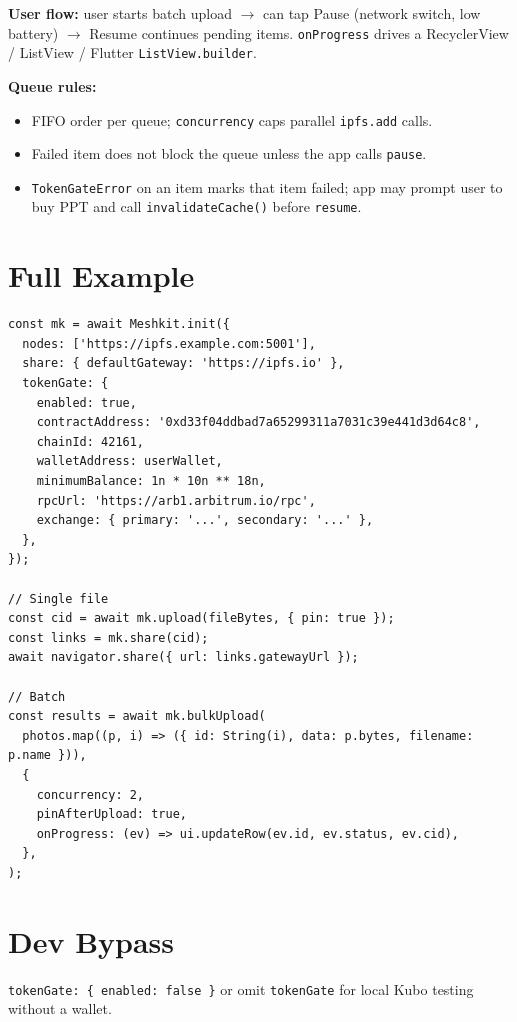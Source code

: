 \documentclass[11pt,a4paper,openany]{report}
\begin{document}
\textbf{User flow:} user starts batch upload $\rightarrow$ can tap Pause (network switch, low battery) $\rightarrow$ Resume continues pending items. \texttt{onProgress} drives a RecyclerView / ListView / Flutter \texttt{ListView.builder}.

\textbf{Queue rules:}
\begin{itemize}[leftmargin=*]
  \item FIFO order per queue; \texttt{concurrency} caps parallel \texttt{ipfs.add} calls.
  \item Failed item does not block the queue unless the app calls \texttt{pause}.
  \item \texttt{TokenGateError} on an item marks that item failed; app may prompt user to buy PPT and call \texttt{invalidateCache()} before \texttt{resume}.
\end{itemize}

\section{Full Example}

\begin{lstlisting}
const mk = await Meshkit.init({
  nodes: ['https://ipfs.example.com:5001'],
  share: { defaultGateway: 'https://ipfs.io' },
  tokenGate: {
    enabled: true,
    contractAddress: '0xd33f04ddbad7a65299311a7031c39e441d3d64c8',
    chainId: 42161,
    walletAddress: userWallet,
    minimumBalance: 1n * 10n ** 18n,
    rpcUrl: 'https://arb1.arbitrum.io/rpc',
    exchange: { primary: '...', secondary: '...' },
  },
});

// Single file
const cid = await mk.upload(fileBytes, { pin: true });
const links = mk.share(cid);
await navigator.share({ url: links.gatewayUrl });

// Batch
const results = await mk.bulkUpload(
  photos.map((p, i) => ({ id: String(i), data: p.bytes, filename: p.name })),
  {
    concurrency: 2,
    pinAfterUpload: true,
    onProgress: (ev) => ui.updateRow(ev.id, ev.status, ev.cid),
  },
);
\end{lstlisting}

\section{Dev Bypass}

\texttt{tokenGate: \{ enabled: false \}} or omit \texttt{tokenGate} for local Kubo testing without a wallet.

\end{document}
